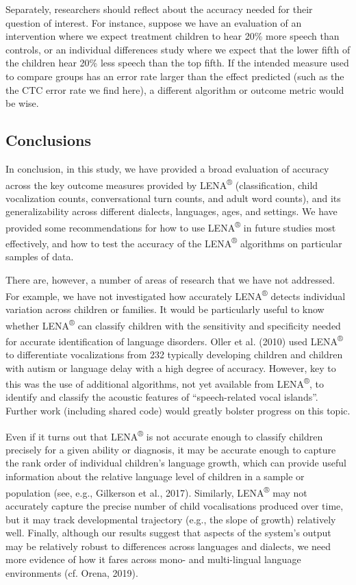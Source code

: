 \documentclass[english,table,man,floatsintext]{apa6}
\begin{document}
Separately, researchers should reflect about the accuracy needed for
their question of interest. For instance, suppose we have an evaluation
of an intervention where we expect treatment children to hear 20\% more
speech than controls, or an individual differences study where we expect
that the lower fifth of the children hear 20\% less speech than the top
fifth. If the intended measure used to compare groups has an error rate
larger than the effect predicted (such as the the CTC error rate we find
here), a different algorithm or outcome metric would be wise.

\subsection{Conclusions}\label{conclusions}

In conclusion, in this study, we have provided a broad evaluation of
accuracy across the key outcome measures provided by
LENA\textsuperscript{®} (classification, child vocalization counts,
conversational turn counts, and adult word counts), and its
generalizability across different dialects, languages, ages, and
settings. We have provided some recommendations for how to use
LENA\textsuperscript{®} in future studies most effectively, and how to
test the accuracy of the LENA\textsuperscript{®} algorithms on
particular samples of data.

There are, however, a number of areas of research that we have not
addressed. For example, we have not investigated how accurately
LENA\textsuperscript{®} detects individual variation across children or
families. It would be particularly useful to know whether
LENA\textsuperscript{®} can classify children with the sensitivity and
specificity needed for accurate identification of language disorders.
Oller et al. (2010) used LENA\textsuperscript{®} to differentiate
vocalizations from 232 typically developing children and children with
autism or language delay with a high degree of accuracy. However, key to
this was the use of additional algorithms, not yet available from
LENA\textsuperscript{®}, to identify and classify the acoustic features
of \enquote{speech-related vocal islands}. Further work (including
shared code) would greatly bolster progress on this topic.

Even if it turns out that LENA\textsuperscript{®} is not accurate enough
to classify children precisely for a given ability or diagnosis, it may
be accurate enough to capture the rank order of individual children's
language growth, which can provide useful information about the relative
language level of children in a sample or population (see, e.g.,
Gilkerson et al., 2017). Similarly, LENA\textsuperscript{®} may not
accurately capture the precise number of child vocalisations produced
over time, but it may track developmental trajectory (e.g., the slope of
growth) relatively well. Finally, although our results suggest that
aspects of the system's output may be relatively robust to differences
across languages and dialects, we need more evidence of how it fares
across mono- and multi-lingual language environments (cf. Orena, 2019).
\end{document}
